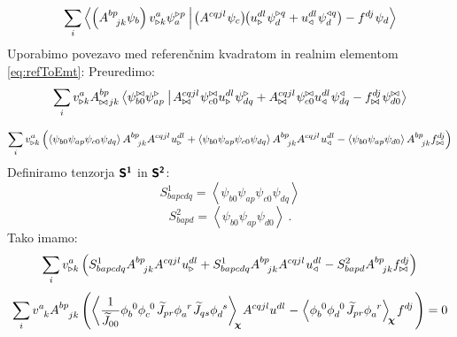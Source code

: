 \begin{equation*}
   \sum_i \bra{
      \left( A^{bp}_{\mkern14mu jk} \psi_b \right)
         v^a_{\triangleright k} \psi^{\triangleright p}_a \mkern4mu}
   \ket{
      \mkern2mu \left(A^{cqjl} \mkern1mu \psi_c \right)
         \mkern-5mu \left(u^{dl}_\triangleright \mkern1mu \psi^{\triangleright q}_d
         +
         u^{dl}_\triangleleft \mkern1mu \psi^{\triangleleft q}_d \right)
      -
      f^{dj} \mkern1mu \psi_d}
\end{equation*}
Uporabimo povezavo med referenčnim kvadratom in realnim elementom \eqref{eq:refToEmt}: Preuredimo:
\begin{equation*}
   \sum_i v^a_{\triangleright k} A^{bp}_{\bowtie \mkern2mu jk} \bra{
      \psi^{\bowtie}_{b0}
         \psi^{\triangleright}_{ap} \mkern4mu}
   \ket{
      \mkern2mu
         A^{cqjl}_{\bowtie} \mkern1mu \psi^{\bowtie}_{c0} u^{dl}_\triangleright \mkern1mu \psi^{\triangleright}_{dq}
         +
         A^{cqjl}_{\bowtie} \mkern1mu \psi^{\bowtie}_{c0} u^{dl}_\triangleleft \mkern1mu \psi^{\triangleleft}_{dq}
      -
      f^{dj}_{\bowtie} \mkern1mu \psi^{\bowtie}_{d0}}
\end{equation*}

\begin{equation*}
   \sum_i v^a_{\triangleright k} \left(
      \left\langle \psi_{b0} \psi_{ap} \psi_{c0} \psi_{dq} \right\rangle A^{bp}_{\mkern14mu jk} A^{cqjl} \mkern1mu u^{dl}_\triangleright
      +
      \left\langle \psi_{b0} \psi_{ap} \psi_{c0} \psi_{dq} \right\rangle A^{bp}_{\mkern14mu jk} A^{cqjl} \mkern1mu u^{dl}_\triangleleft
      -
      \left\langle \psi_{b0} \psi_{ap} \psi_{d0} \right\rangle A^{bp}_{\mkern14mu jk} f^{dj}_{\bowtie}
   \right)
\end{equation*}
Definiramo tenzorja $\bm{\mathsf{S^1}}$ in $\bm{\mathsf{S^2}}$:
\begin{equation}
   S^1_{bapcdq} = \left\langle \psi_{b0} \psi_{ap} \psi_{c0} \psi_{dq} \right\rangle
\end{equation}
\begin{equation}
   S^2_{bapd} = \left\langle \psi_{b0} \psi_{ap} \psi_{d0} \right\rangle \ .
\end{equation}
Tako imamo:
\begin{equation}
   \sum_i v^a_{\triangleright k} \left(
      S^1_{bapcdq} A^{bp}_{\mkern14mu jk} A^{cqjl} \mkern1mu u^{dl}_\triangleright
      +
      S^1_{bapcdq} A^{bp}_{\mkern14mu jk} A^{cqjl} \mkern1mu u^{dl}_\triangleleft
      -
      S^2_{bapd} A^{bp}_{\mkern14mu jk} f^{dj}_{\bowtie}
   \right)
\end{equation}
\begin{equation}
   \sum_i v^a_{\phantom{a}k} A^{bp}_{\phantom{bp}jk} \left( \left\langle \frac{1}{\widetilde{J}_{00}} \phi^{\phantom{b}0}_b \phi^{\phantom{c}0}_c \mkern2mu \widetilde{J}_{pr}  \phi^{\phantom{a}r}_a \mkern1mu \widetilde{J}_{qs}  \phi^{\phantom{d}s}_d \right\rangle_{\mkern-5mu\bm{\chi}} \mkern-2mu A^{cqjl} u^{dl} \mkern1mu - \mkern1mu \left\langle\phi^{\phantom{b}0}_b \phi^{\phantom{d}0}_d \mkern2mu \widetilde{J}_{pr}  \phi^{\phantom{a}r}_a \right\rangle_{\mkern-3mu\bm{\chi}} \mkern-1mu f^{dj} \mkern2mu \right) = 0
\end{equation}

